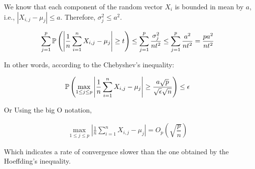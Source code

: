 We know that each component of the random vector $X_i$ is bounded in mean by $a$, i.e., $|X_{i,j} - \mu_{j}| \leq a$. Therefore, $\sigma_j^2 \leq a^2$.

\begin{align*}
\sum_{j=1}^{p} \mathbb{P}\left(
    \left|
        \frac{1}{n} \sum_{i=1}^{n} X_{i,j} - \mu_{j}
    \right|
    \geq
    t
\right)
\leq
\sum_{j=1}^{p} \frac{\sigma_j^2}{n t^2} \leq \sum_{j=1}^{p} \frac{a^2}{n t^2} = \frac{p a^2}{n t^2}
\end{align*}

In other words, according to the Chebyshev's inequality:

\begin{align*}
\mathbb{P}\left(
    \max_{1 \leq j \leq p}{
        \left|
            \frac{1}{n} \sum_{i=1}^{n} X_{i,j} - \mu_{j}
        \right|
    }
    \geq
    \dfrac{a \sqrt{p}}{\sqrt{\epsilon}\sqrt{n}}
\right)
\leq
\epsilon
\end{align*}

Or Using the big O notation,

\begin{align*}
    \max_{1 \leq j \leq p}{
        \left|
            \frac{1}{n} \sum_{i=1}^{n} X_{i,j} - \mu_{j}
        \right|
    }
= O_p\left(\sqrt{\dfrac{p}{n}}\right)
\end{align*}

Which indicates a rate of convergence slower than the one obtained by the Hoeffding's inequality.